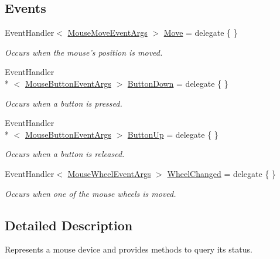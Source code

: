 \subsection*{Events}
\begin{DoxyCompactItemize}
\item 
Event\-Handler$<$ \hyperlink{class_open_t_k_1_1_input_1_1_mouse_move_event_args}{Mouse\-Move\-Event\-Args} $>$ \hyperlink{class_open_t_k_1_1_input_1_1_mouse_device_ae98bb40aa03f634ecb53a73971dd9097}{Move} = delegate \{ \}
\begin{DoxyCompactList}\small\item\em Occurs when the mouse's position is moved. \end{DoxyCompactList}\item 
Event\-Handler\\*
$<$ \hyperlink{class_open_t_k_1_1_input_1_1_mouse_button_event_args}{Mouse\-Button\-Event\-Args} $>$ \hyperlink{class_open_t_k_1_1_input_1_1_mouse_device_a6d161629ddeb7adefb6f8332824778bd}{Button\-Down} = delegate \{ \}
\begin{DoxyCompactList}\small\item\em Occurs when a button is pressed. \end{DoxyCompactList}\item 
Event\-Handler\\*
$<$ \hyperlink{class_open_t_k_1_1_input_1_1_mouse_button_event_args}{Mouse\-Button\-Event\-Args} $>$ \hyperlink{class_open_t_k_1_1_input_1_1_mouse_device_a244f6f68b32bfe3f745e2b8087e970e8}{Button\-Up} = delegate \{ \}
\begin{DoxyCompactList}\small\item\em Occurs when a button is released. \end{DoxyCompactList}\item 
Event\-Handler$<$ \hyperlink{class_open_t_k_1_1_input_1_1_mouse_wheel_event_args}{Mouse\-Wheel\-Event\-Args} $>$ \hyperlink{class_open_t_k_1_1_input_1_1_mouse_device_a4bee8a35ae92c6d4f74868934a5c2475}{Wheel\-Changed} = delegate \{ \}
\begin{DoxyCompactList}\small\item\em Occurs when one of the mouse wheels is moved. \end{DoxyCompactList}\end{DoxyCompactItemize}


\subsection{Detailed Description}
Represents a mouse device and provides methods to query its status. 



